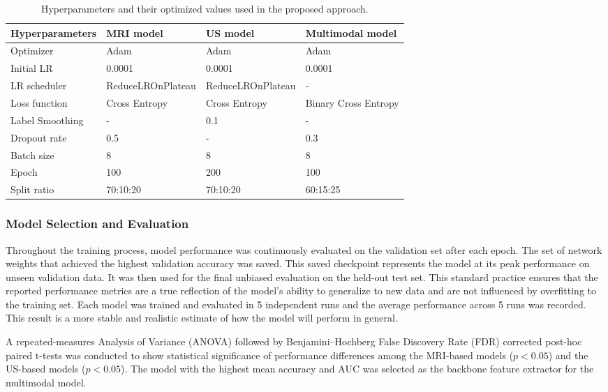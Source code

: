 \documentclass[12pt]{article}
\begin{document}
\begin{table}[htbp]
\centering
\caption{Hyperparameters and their optimized values used in the proposed approach.}
\label{tab:hyperparameters}
\begin{tabular}{llll}
\hline
\textbf{Hyperparameters}        & \textbf{MRI model} & \textbf{US model} & \textbf{Multimodal model}      \\ \hline
Optimizer       & Adam & Adam & Adam                         \\
Initial LR      & 0.0001 & 0.0001  & 0.0001                        \\
LR scheduler    & ReduceLROnPlateau        & ReduceLROnPlateau    &-                \\
Loss function   & Cross Entropy     & Cross Entropy & Binary Cross Entropy    \\
Label Smoothing & -     & 0.1    & -  \\
Dropout rate    & 0.5     & -   &0.3 \\
Batch size      & 8      & 8     & 8                        \\
Epoch           & 100     & 200    & 100                     \\
Split ratio     & 70:10:20   & 70:10:20   & 60:15:25                   \\
\hline
\end{tabular}
\end{table}

\subsubsection{Model Selection and Evaluation}

Throughout the training process, model performance was continuously evaluated on the validation set after each epoch. The set of network weights that achieved the highest validation accuracy was saved. This saved checkpoint represents the model at its peak performance on unseen validation data. It was then used for the final unbiased evaluation on the held-out test set. This standard practice ensures that the reported performance metrics are a true reflection of the model's ability to generalize to new data and are not influenced by overfitting to the training set. Each model was trained and evaluated in 5 independent runs and the average performance across 5 runs was recorded. This result is a more stable and realistic estimate of how the model will perform in general.

A repeated-measures Analysis of Variance (ANOVA) followed by Benjamini–Hochberg False Discovery Rate (FDR) corrected post-hoc paired t-tests was conducted to show statistical significance of performance differences among the MRI-based models ($p < 0.05$) and the US-based models ($p < 0.05$). The model with the highest mean accuracy and AUC was selected as the backbone feature extractor for the multimodal model. 
\end{document}
